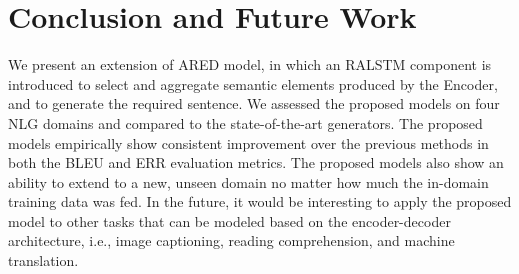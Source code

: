 \documentclass[11pt,a4paper]{article}
\begin{document}
\section{Conclusion and Future Work}\label{sec:conclusion}
We present an extension of ARED model, in which an RALSTM component is introduced to select and aggregate semantic elements produced by the Encoder, and to generate the required sentence. We assessed the proposed models on four NLG domains and compared to the state-of-the-art generators. The proposed models empirically show consistent improvement over the previous methods in both the BLEU and ERR evaluation metrics. The proposed models also show an ability to extend to a new, unseen domain no matter how much the in-domain training data was fed. In the future, it would be interesting to apply the proposed model to other tasks that can be modeled based on the encoder-decoder architecture, i.e., image captioning, reading comprehension, and machine translation.








\end{document}
